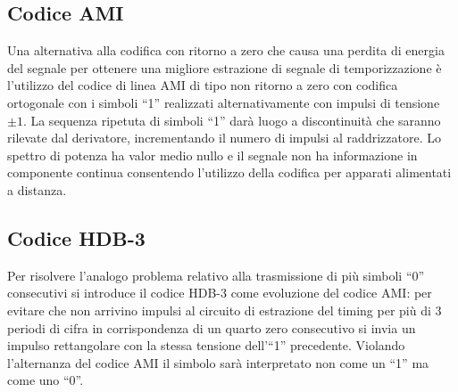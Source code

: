 \subsection{Codice \ac{AMI}}
Una alternativa alla codifica con ritorno a zero che causa una perdita di energia del segnale per ottenere una migliore estrazione di segnale di temporizzazione è l'utilizzo del codice di linea \ac{AMI} di tipo non ritorno a zero con codifica ortogonale con i simboli “1” realizzati alternativamente con impulsi di tensione $\pm 1$. La sequenza ripetuta di simboli “1” darà luogo a discontinuità che saranno rilevate dal derivatore, incrementando il numero di impulsi al raddrizzatore. Lo spettro di potenza ha valor medio nullo e il segnale non ha informazione in componente continua consentendo l'utilizzo della codifica per apparati alimentati a distanza.

\begin{figure}[ht!]\centering
{}
%
\end{figure}

\subsection{Codice \ac{HDB-3}}
Per risolvere l'analogo problema relativo alla trasmissione di più simboli “0” consecutivi si introduce il codice \ac{HDB-3} come evoluzione del codice \ac{AMI}: per evitare che non arrivino impulsi al circuito di estrazione del timing per più di 3 periodi di cifra in corrispondenza di un quarto zero consecutivo si invia un impulso rettangolare con la stessa tensione dell'“1” precedente. Violando l'alternanza del codice \ac{AMI} il simbolo sarà interpretato non come un “1” ma come uno “0”.

